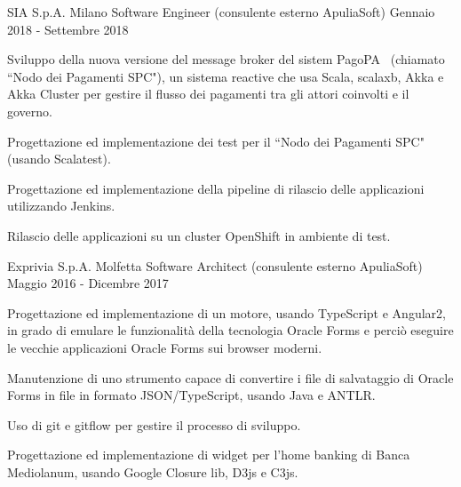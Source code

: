 \documentclass{resume} %
\begin{document}

\cvEntry
  {SIA S.p.A.}
  {Milano}
  {Software Engineer (consulente esterno ApuliaSoft)}
  {Gennaio 2018 - Settembre 2018}{
    \begin{cvEntryItems}
      \item Sviluppo della nuova versione del message broker del sistem PagoPA\textregistered~
            (chiamato ``Nodo dei Pagamenti SPC"), un sistema reactive che usa Scala, scalaxb,
            Akka e Akka Cluster per gestire il flusso dei pagamenti tra gli attori coinvolti
            e il governo.
      \item Progettazione ed implementazione dei test per il ``Nodo dei Pagamenti SPC" (usando
            Scalatest).
      \item Progettazione ed implementazione della pipeline di rilascio delle applicazioni
            utilizzando Jenkins.
      \item Rilascio delle applicazioni su un cluster OpenShift in ambiente di test.
    \end{cvEntryItems}
}


\cvEntry
  {Exprivia S.p.A.}
  {Molfetta}
  {Software Architect (consulente esterno ApuliaSoft)}
  {Maggio 2016 - Dicembre 2017}{
    \begin{cvEntryItems}
      \item Progettazione ed implementazione di un motore, usando TypeScript e Angular2, in
            grado di emulare le funzionalit\`a della tecnologia Oracle Forms e perci\`o
            eseguire le vecchie applicazioni Oracle Forms sui browser moderni.
      \item Manutenzione di uno strumento capace di convertire i file di salvataggio di Oracle
            Forms in file in formato JSON/TypeScript, usando Java e ANTLR.
      \item Uso di git e gitflow per gestire il processo di sviluppo.
      \item Progettazione ed implementazione di widget per l'home banking di Banca Mediolanum,
            usando Google Closure lib, D3js e C3js.
    \end{cvEntryItems}
}

\end{document}
